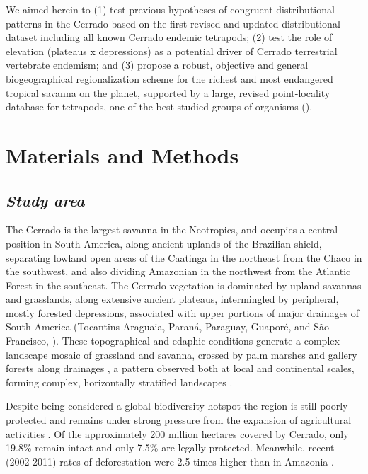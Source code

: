 \documentclass[12pt,openright,oneside,a4paper,english]{abntex2}
\begin{document}
We aimed herein to (1) test previous hypotheses of congruent distributional patterns in the Cerrado based on the first revised and updated distributional dataset including all known Cerrado endemic tetrapods; (2) test the role of elevation (plateaus x depressions) as a potential driver of Cerrado terrestrial vertebrate endemism; and (3) propose a robust, objective and general biogeographical regionalization scheme for the richest and most endangered tropical savanna on the planet, supported by a large, revised point-locality database for tetrapods, one of the best studied groups of organisms (\citealp[see][]{Gaston1996, Roll2017}).

\section{Materials and Methods}
\subsection{\textit{Study area}}

The Cerrado is the largest savanna in the Neotropics, and occupies a central position in South America, along ancient uplands of the Brazilian shield, separating lowland open areas of the Caatinga in the northeast from the Chaco in the southwest, and also dividing Amazonian in the northwest from the Atlantic Forest in the southeast. The Cerrado vegetation is dominated by upland savannas and grasslands, along extensive ancient plateaus, intermingled by peripheral, mostly forested depressions, associated with upper portions of major drainages of South America (Tocantins-Araguaia, Paraná, Paraguay, Guaporé, and São Francisco, \citet{Absaber1998}). These topographical and edaphic conditions generate a complex landscape mosaic of grassland and savanna, crossed by palm marshes and gallery forests along drainages \citep{Eiten1972, Ratter1997}, a pattern observed both at local and continental scales, forming complex, horizontally stratified landscapes \citep{Silva2002, Colli2020}.

Despite being considered a global biodiversity hotspot \citep{Myers2000} the region is still poorly protected and remains under strong pressure from the expansion of agricultural activities \citep{Strassburg2017, Grande2020, Pacheco2021}. Of the approximately 200 million hectares covered by Cerrado, only 19.8\% remain intact and only 7.5\% are legally protected. Meanwhile, recent (2002-2011) rates of deforestation were 2.5 times higher than in Amazonia \citep{Strassburg2017}.
\end{document}
